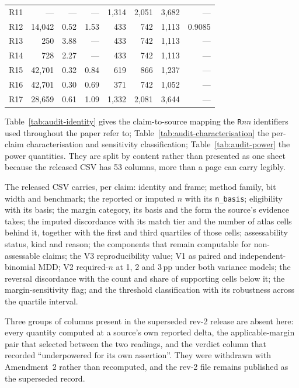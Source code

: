 \begin{table}[!t]
\begin{tabular}{@{}lrrrrrrr@{}}
R11 & --- & --- & --- & 1{,}314 & 2{,}051 & 3{,}682 & --- \\
R12 & 14{,}042 & 0.52 & 1.53 & 433 & 742 & 1{,}113 & 0.9085 \\
R13 & 250 & 3.88 & --- & 433 & 742 & 1{,}113 & --- \\
R14 & 728 & 2.27 & --- & 433 & 742 & 1{,}113 & --- \\
R15 & 42{,}701 & 0.32 & 0.84 & 619 & 866 & 1{,}237 & --- \\
R16 & 42{,}701 & 0.30 & 0.69 & 371 & 742 & 1{,}052 & --- \\
R17 & 28{,}659 & 0.61 & 1.09 & 1{,}332 & 2{,}081 & 3{,}644 & --- \\
\bottomrule
\end{tabular}
\end{table}

Table~\ref{tab:audit-identity} gives the claim-to-source mapping the
\texttt{R}\emph{nn} identifiers used throughout the paper refer to;
Table~\ref{tab:audit-characterisation} the per-claim characterisation and
sensitivity classification; Table~\ref{tab:audit-power} the power quantities.
They are split by content rather than presented as one sheet because the
released CSV has 53 columns, more than a page can carry legibly.

The released CSV carries, per claim: identity and frame; method family, bit
width and benchmark; the reported or imputed $n$ with its \texttt{n\_basis};
eligibility with its basis; the margin category, its basis and the form the
source's evidence takes; the imputed discordance with its match tier and the
number of atlas cells behind it, together with the first and third quartiles of
those cells; assessability status, kind and reason; the components that remain
computable for non-assessable claims; the V3 reproducibility value; V1 as
paired and independent-binomial MDD; V2 required-$n$ at 1, 2 and 3\,pp under
both variance models; the reversal discordance with the count and share of
supporting cells below it; the margin-sensitivity flag; and the threshold
classification with its robustness across the quartile interval.

Three groups of columns present in the superseded rev-2 release are absent here:
every quantity computed at a source's own reported delta, the applicable-margin
pair that selected between the two readings, and the verdict column that
recorded ``underpowered for its own assertion''. They were withdrawn with
Amendment~2 rather than recomputed, and the rev-2 file remains published as the
superseded record.

